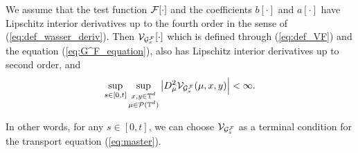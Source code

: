 \begin{lem}\label{lem:reg_VF_VFNM}We assume that the test function $\mathcal{F}[\cdot]$ and the coefficients $b[\cdot]$ and $a[\cdot]$ have Lipschitz interior derivatives up to the fourth order in the sense of (\ref{eq:def_wasser_deriv}). Then $\mathcal{V}_{\mathcal{G}_s^{\mathcal{F}}}[\cdot]$ which is defined through (\ref{eq:def_VF}) and the equation (\ref{eq:G^F_equation}), also has Lipschitz interior derivatives up to second order, and
\begin{equation}\label{eq:unif_bound_V_F}
    \sup_{s \in [0,t]}\sup_{\substack{x,y \in \mathbb{T}^d\\ \mu \in \mathcal{P}(\mathbb{T}^d)}} \big|D^2_{\mu}\mathcal{V}_{\mathcal{G}_s^{\mathcal{F}}}(\mu, x, y)\Big| < \infty. 
\end{equation}
\end{lem}

In other words, for any $s \in [0,t]$, we can choose $\mathcal{V}_{\mathcal{G}_s^{\mathcal{F}}}$ as a terminal condition for the transport equation (\ref{eq:master}). 


